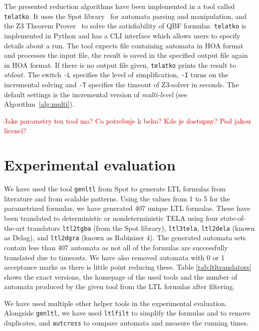 \documentclass[a4paper,UKenglish,cleveref, autoref, thm-restate]{lipics-v2021}
\newcommand{\todo}[1]{\textcolor{red}{#1}}
\newcommand{\telatko}{\texttt{telatko}\xspace}
\begin{document}
The presented reduction algorithms have been implemented in a tool called
\telatko. It uses the Spot library~\cite{duret.16.atva2} for automata parsing
and manipulation, and the Z3 Theorem Prover~\cite{demoura.08.tacas} to solve
the satisfiability of QBF formulas. \telatko is implemented in Python
and has a CLI interface which allows users to specify details about a run. The tool expects file containing automata in HOA format ~\cite{babiak.15.cav} and processes the input file, the result is saved in the specified output file again in HOA format. If there is no output file given, \telatko prints the result to $\mathit{stdout}$. 
The switch \texttt{-L} specifies the level of simplification, \texttt{-I} turns on the incremental solving and \texttt{-T} specifies the timeout of Z3-solver in seconds. The default settings is the incremental version of \emph{multi-level} (see Algorithm~\ref{alg:multi}).

\todo{Jake parametry ten tool ma? Co potrebuje k behu? Kde je dostupny? Pod jakou licenci?}


\section{Experimental evaluation}\label{sec:experiments}

We have used the tool \texttt{genltl} from Spot to generate LTL formulas
from literature and from scalable patterns. Using the values from 1 to 5 for
the parametrized formulas, we have generated 407 unique LTL formulas. These
have been translated to deterministic or nondeterministic TELA using four
state-of-the-art translators \texttt{ltl2tgba} (from the Spot library),
\texttt{ltl3tela}, \texttt{ltl2dela} (known as Delag), and \texttt{ltl2dgra}
(known as Rabinizer 4). The generated automata sets contain less than 407
automata as not all of the formulas are successfully translated due to timeouts.
We have also removed automata with 0 or 1 acceptance marks as there is little
point reducing these.
Table \ref{tab:ltltranslators} shows the exact versions, the homepage of the
used tools and the number of automata produced by the given tool from
the LTL formulas after filtering.

We have used multiple other helper tools in the experimental evaluation.
Alongside \texttt{genltl}, we have used \texttt{ltlfilt} to simplify the
formulas and to remove duplicates, and \texttt{autcross} to compare automata and
measure the running times.
\end{document}
